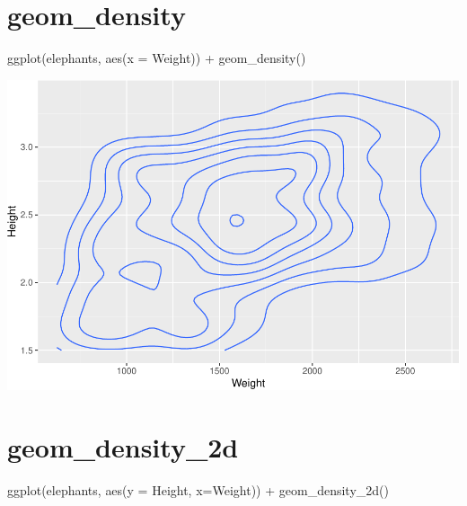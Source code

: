 \documentclass[
]{book}
\newenvironment{Shaded}{\begin{snugshade}}{\end{snugshade}}
\newcommand{\AttributeTok}[1]{\textcolor[rgb]{0.77,0.63,0.00}{#1}}
\newcommand{\FunctionTok}[1]{\textcolor[rgb]{0.00,0.00,0.00}{#1}}
\newcommand{\NormalTok}[1]{#1}
\newcommand{\SpecialCharTok}[1]{\textcolor[rgb]{0.00,0.00,0.00}{#1}}
\begin{document}
\hypertarget{geom_density}{%
\section{geom\_density}\label{geom_density}}

\begin{Shaded}
\begin{Highlighting}[]
\FunctionTok{ggplot}\NormalTok{(elephants, }\FunctionTok{aes}\NormalTok{(}\AttributeTok{x =}\NormalTok{ Weight)) }\SpecialCharTok{+} 
  \FunctionTok{geom\_density}\NormalTok{()}
\end{Highlighting}
\end{Shaded}

\includegraphics{Data-Visualisation-geom-Encyclopedia_files/figure-latex/unnamed-chunk-32-1.pdf}

\hypertarget{geom_density_2d}{%
\section{geom\_density\_2d}\label{geom_density_2d}}

\begin{Shaded}
\begin{Highlighting}[]
\FunctionTok{ggplot}\NormalTok{(elephants, }\FunctionTok{aes}\NormalTok{(}\AttributeTok{y =}\NormalTok{ Height, }\AttributeTok{x=}\NormalTok{Weight)) }\SpecialCharTok{+} 
  \FunctionTok{geom\_density\_2d}\NormalTok{()}
\end{Highlighting}
\end{Shaded}
\end{document}
